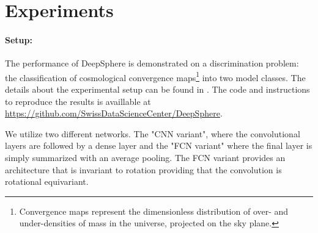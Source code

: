 \documentclass{article} %
\newcommand{\1}{\b{1}}              %
\newcommand{\0}{\b{0}}              %
\newcommand{\todo}[1]{{\color[rgb]{.6,.1,.6}{#1}}}
\begin{document}
\section{Experiments}


\paragraph{Setup:}
The performance of DeepSphere is demonstrated on a discrimination problem: the classification of cosmological convergence maps\footnote{Convergence maps represent the dimensionless distribution of over- and under-densities of mass in the universe, projected on the sky plane.} into two model classes. 
The details about the experimental setup can be found in \cite{perraudin2018deepsphere}. The code and instructions to reproduce the results is availlable at \url{https://github.com/SwissDataScienceCenter/DeepSphere}.


We utilize two different networks. The "CNN variant", where the convolutional layers are followed by a dense layer and the "FCN variant" where the final layer is simply summarized with an average pooling. 
The FCN variant provides an architecture that is invariant to rotation providing that the convolution is rotational equivariant.
\end{document}
